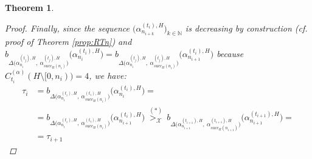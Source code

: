 \documentclass{amsart}
\newcommand\Nat{\mathbb{N}}
\newcommand{\LoX}{\mathcal{X}}
\newtheorem{theorem}{Theorem}
\begin{document}
\begin{theorem}
\begin{proof}




Finally, since the sequence $\big(\alpha_{n_{i+k}}^{(t_i),H}\big)_{k \in \Nat}$ is decreasing by construction (cf. proof of Theorem \ref{prop:RTn}) and $b_{\Delta\big(\alpha_{n_i}^{(t_j),H},\ \alpha_{succ_H(n_i)}^{(t_j),H}\big)}\big(\alpha_{n_i}^{(t_i),H}\big) = b_{\Delta\big(\alpha_{n_i}^{(t_j),H},\ \alpha_{succ_H(n_i)}^{(t_j),H}\big)}\big(\alpha_{n_{i+1}}^{(t_i),H}\big)$ because $C_{t_i}^{(\alpha)}(H \setminus [0,n_i))=4$, we have:\\

\begin{equation*}
\begin{split}
\tau_i &= b_{\Delta\big(\alpha_{n_i}^{(t_i),H},\ \alpha_{succ_H(n_i)}^{(t_i),H}\big)}\big(\alpha_{n_i}^{(t_i),H}\big)= \\
&= b_{\Delta\big(\alpha_{n_i}^{(t_i),H},\ \alpha_{succ_H(n_i)}^{(t_i),H}\big)}\big(\alpha_{n_{i+1}}^{(t_i),H}\big) \ \overset{(*)}{>_\LoX}\ b_{\Delta\big(\alpha_{n_{i+1}}^{(t_{i+1}),H},\ \alpha_{succ_H(n_{i+1})}^{(t_{i+1}),H}\big)}\big(\alpha_{n_{i+1}}^{(t_{i+1}),H}\big)=\\[7pt]
&= \tau_{i+1}
\end{split}
\end{equation*}


\end{proof}
\end{theorem}
\end{document}

